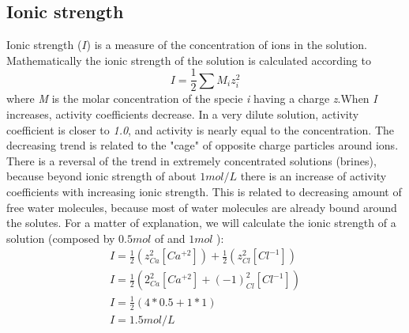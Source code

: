 \subsection{Ionic strength}
Ionic strength ($I$) is a measure of the concentration of ions in the solution.  Mathematically the ionic strength of the solution is calculated according to
\begin{equation} \label{eq:ionicStrength}
I = \frac{1}{2} \sum{M_i z_i^2}
\end{equation}
where \emph{M} is the molar concentration of the specie \emph{i} having a charge \emph{z}.When \emph{I} increases, activity coefficients decrease. In a very dilute solution, activity coefficient is closer to \emph{1.0}, and activity is nearly equal to the concentration. The decreasing trend is related to the "cage" of opposite charge particles around ions. There is a reversal of the trend in extremely concentrated solutions (brines), because beyond ionic strength of about $1 mol/L$ there is an increase of activity coefficients with increasing ionic strength. This is related to decreasing amount of free water molecules, because most of water molecules are already bound around the solutes.
For a matter of explanation, we will calculate the ionic strength of a  solution (composed by $0.5 mol$ of  and $1 mol$ ):
\begin{eqnarray}
I = \frac{1}{2}  (z^2_{Ca}[Ca^{+2}]) + \frac{1}{2}  (z^2_{Cl}[Cl^{-1}]) \\
I = \frac{1}{2}  (2^2_{Ca}[Ca^{+2}] +  (-1)^2_{Cl}[Cl^{-1}]) \\
I = \frac{1}{2} (4 * 0.5 + 1 * 1) \\
I = 1.5 mol/L
\end{eqnarray}


